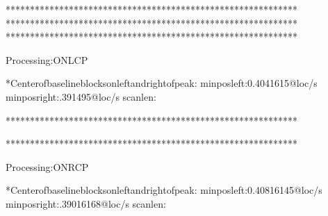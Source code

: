 \documentclass[letterpaper,10pt,english]{sphinxmanual}
\begin{document}
\begin{sphinxVerbatim}[commandchars=\\\{\},numbers=left,firstnumber=1,stepnumber=1]
************************************************************
************************************************************
************************************************************

\PYGZhy{}Processing:ON\PYGZus{}LCP




*Centerofbaselineblocksonleftandrightofpeak:
minposleft:\PYG{o}{[}\PYGZhy{}0.4041615\PYG{o}{]}@loc/s\PYG{o}{[}\PYG{o}{]}
minposright:\PYG{o}{[}.391495\PYG{o}{]}@loc/s\PYG{o}{[}\PYG{o}{]}
scanlen:

************************************************************


************************************************************



\PYGZhy{}Processing:ON\PYGZus{}RCP




*Centerofbaselineblocksonleftandrightofpeak:
minposleft:\PYG{o}{[}\PYGZhy{}0.40816145\PYG{o}{]}@loc/s\PYG{o}{[}\PYG{o}{]}
minposright:\PYG{o}{[}.39016168\PYG{o}{]}@loc/s\PYG{o}{[}\PYG{o}{]}
scanlen:


\end{sphinxVerbatim}
\end{document}
